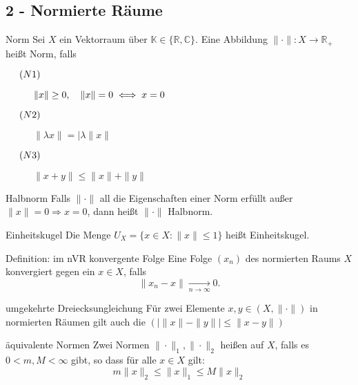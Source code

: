 \subsection*{2 - Normierte Räume}

	\begin{karte}{Norm}
	Sei $X$ ein Vektorraum über $\mathbb{K} \in \{ \mathbb{R}, \mathbb{C} \}$. Eine Abbildung  $\| \cdot \| \colon X \rightarrow \mathbb{R}_{+}$ hei{\ss}t Norm, falls
		\begin{description}
			\item[$\hspace{0.5cm} (N1) \hspace{0.1cm} $] $\| x \| \geq 0, \quad \| x \| = 0 \iff x = 0 $
			\item[$\hspace{0.5cm} (N2) \hspace{0.1cm} $] $\| \lambda x \| = | \lambda \| x \| $
			\item[$\hspace{0.5cm} (N3) \hspace{0.1cm} $] $\| x + y \| \leq \| x \| + \| y \| $
		\end{description}
	\end{karte}
	
	\begin{karte}{Halbnorm}
		Falls $ \| \cdot \| $ all die Eigenschaften einer Norm erfüllt au{\ss}er $ \| x \| = 0 \Rightarrow x = 0 $, dann hei{\ss}t $ \| \cdot \| $ Halbnorm.
	\end{karte}
	
	\begin{karte}{Einheitskugel}
		Die Menge $ U_{X} = \{ x \in X:  \|x \| \leq 1 \}$ hei{\ss}t Einheitskugel.
	\end{karte}
	
	\begin{karte}{Definition: im nVR konvergente Folge}
		Eine Folge $(x_{n})$ des normierten Raums $X$ konvergiert gegen ein $ x \in X $, falls 
		\[ \| x_{n} - x \| \xrightarrow[n \rightarrow \infty]{} 0. \]
	\end{karte}
	
	\begin{karte}{umgekehrte Dreiecksungleichung}
		Für zwei Elemente $x, y \in (X, \| \cdot \|)$ in normierten Räumen gilt auch die  $( \left| \| x \| - \| y \| \right| \leq \| x - y \|)$
	\end{karte}
	
	\begin{karte}{äquivalente Normen}
		Zwei Normen $\| \cdot \|_{1}, \| \cdot \|_{2}$ hei{\ss}en  auf $X$, falls es $0 < m, M < \infty$ gibt, so dass für alle $ x \in X$ gilt:
		\[ m \| x \|_{2} \leq \| x \|_{1} \leq M \| x \|_{2} \]
	\end{karte}
	
